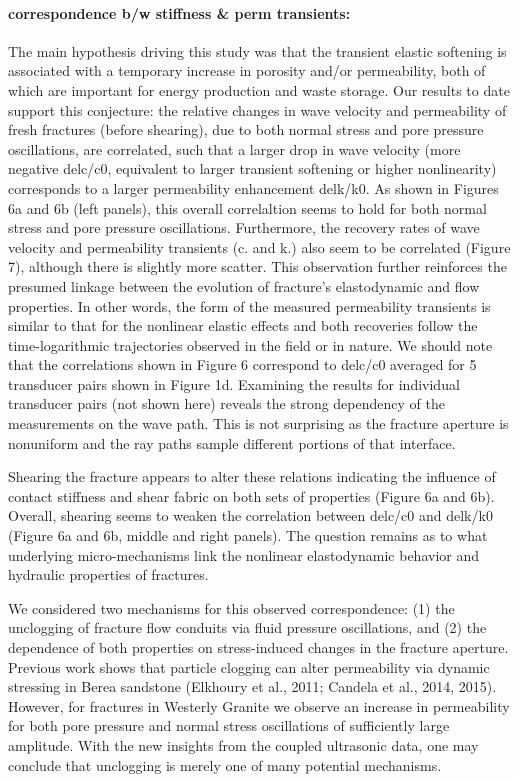 \documentclass[letterpaper,10pt]{article}
\begin{document}
\paragraph{correspondence b/w stiffness \& perm transients:}
The main hypothesis driving this study was that the transient elastic softening is associated with a temporary increase in porosity and/or permeability, both of which are important for energy production and waste storage. Our results to date support this conjecture: the relative changes in wave velocity and permeability of fresh fractures (before shearing), due to both normal stress and pore pressure oscillations, are correlated, such that a larger drop in wave velocity (more negative delc/c0, equivalent to larger transient softening or higher nonlinearity) corresponds to a larger permeability enhancement delk/k0.  As shown in Figures 6a and 6b (left panels), this overall correlaltion seems to hold for both normal stress and pore pressure oscillations. Furthermore, the recovery rates of wave velocity and permeability transients (c. and k.) also seem to be correlated (Figure 7), although there is slightly more scatter. This observation further reinforces the presumed linkage between the evolution of fracture's elastodynamic and flow properties. In other words, the form of the measured permeability transients is similar to that for the nonlinear elastic effects and both recoveries follow the time-logarithmic trajectories observed in the field or in nature. We should note that the correlations shown in Figure 6 correspond to delc/c0 averaged for 5 transducer pairs shown in Figure 1d. Examining the results for individual transducer pairs (not shown here) reveals the strong dependency of the measurements on the wave path. This is not surprising as the fracture aperture is nonuniform and the ray paths sample different portions of that interface. 

Shearing the fracture appears to alter these relations indicating the influence of contact stiffness and shear fabric on both sets of properties (Figure 6a and 6b). Overall, shearing seems to weaken the correlation between delc/c0 and delk/k0 (Figure 6a and 6b, middle and right panels). The question remains as to what underlying micro-mechanisms link the nonlinear elastodynamic behavior and hydraulic properties of fractures. 

We considered two mechanisms for this observed correspondence: (1) the unclogging of fracture flow conduits via fluid pressure oscillations, and (2) the dependence of both properties on stress-induced changes in the fracture aperture. Previous work shows that particle clogging can alter permeability via dynamic stressing in Berea sandstone (Elkhoury et al., 2011; Candela et al., 2014, 2015). However, for fractures in Westerly Granite we observe an increase in permeability for both pore pressure and normal stress oscillations of sufficiently large amplitude. With the new insights from the coupled ultrasonic data, one may conclude that unclogging is merely one of many potential mechanisms. 
\end{document}
